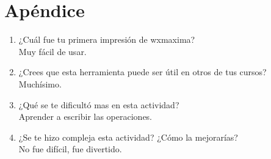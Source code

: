 \documentclass{article}
\begin{document}
\section{Apéndice}
\begin{enumerate}
\item ¿Cuál fue tu primera impresión de wxmaxima?
\\Muy fácil de usar.
\item ¿Crees que esta herramienta puede ser útil en otros de tus cursos?
\\Muchísimo.
\item ¿Qué se te dificultó mas en esta actividad?
\\Aprender a escribir las operaciones.
\item ¿Se te hizo compleja esta actividad? ¿Cómo la mejorarías? 
\\No fue difícil, fue divertido.
\end{enumerate}
\end{document}
